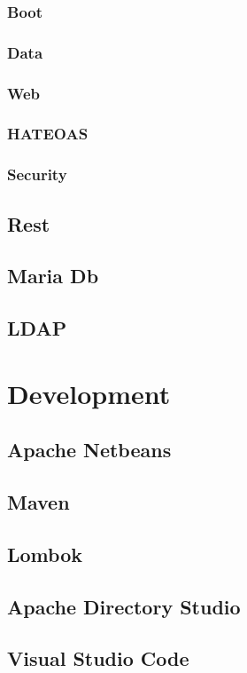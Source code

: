 \subsubsection{Boot}
\subsubsection{Data}
\subsubsection{Web}
\subsubsection{HATEOAS}
\subsubsection{Security}

\subsection{Rest}
\subsection{Maria Db}
\subsection{LDAP}

\section{Development}
\subsection{Apache Netbeans}
\subsection{Maven}
\subsection{Lombok}
\subsection{Apache Directory Studio}
\subsection{Visual Studio Code}

